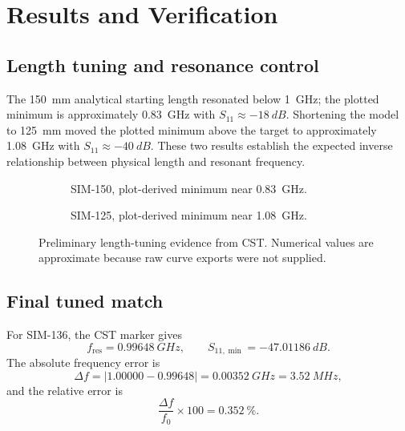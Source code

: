 \section{Results and Verification}

\subsection{Length tuning and resonance control}
The \SI{150}{mm} analytical starting length resonated below \SI{1}{GHz}; the plotted
minimum is approximately \SI{0.83}{GHz} with $S_{11}\approx-\SI{18}{dB}$.
Shortening the model to \SI{125}{mm} moved the plotted minimum above the target to
approximately \SI{1.08}{GHz} with $S_{11}\approx-\SI{40}{dB}$. These two results
establish the expected inverse relationship between physical length and resonant
frequency.

\begin{figure}[H]
\centering
\begin{subfigure}[t]{0.48\textwidth}
\centering
{}
\caption{SIM-150, plot-derived minimum near \SI{0.83}{GHz}.}
\end{subfigure}\hfill
\begin{subfigure}[t]{0.48\textwidth}
\centering
{}
\caption{SIM-125, plot-derived minimum near \SI{1.08}{GHz}.}
\end{subfigure}
\caption{Preliminary length-tuning evidence from CST. Numerical values are approximate because raw curve exports were not supplied.}
\label{fig:preliminary-s11}
\end{figure}

\subsection{Final tuned match}
For SIM-136, the CST marker gives
\begin{equation}
f_{\mathrm{res}}=\SI{0.99648}{GHz},
\qquad
S_{11,\min}=-\SI{47.01186}{dB}.
\end{equation}
The absolute frequency error is
\begin{equation}
\Delta f=|1.00000-0.99648|=\SI{0.00352}{GHz}=\SI{3.52}{MHz},
\end{equation}
and the relative error is
\begin{equation}
\frac{\Delta f}{f_0}\times100=\SI{0.352}{\percent}.
\end{equation}

